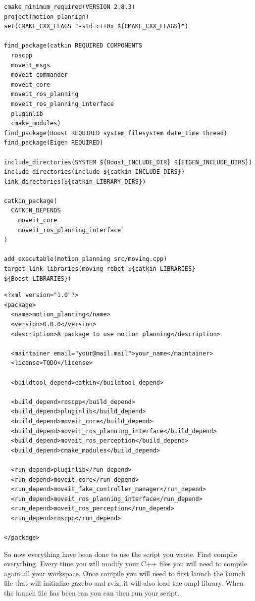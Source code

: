 \begin{lstlisting}[caption=CMakeLists.txt]
cmake_minimum_required(VERSION 2.8.3)
project(motion_plannign)
set(CMAKE_CXX_FLAGS "-std=c++0x ${CMAKE_CXX_FLAGS}")

find_package(catkin REQUIRED COMPONENTS
  roscpp
  moveit_msgs
  moveit_commander
  moveit_core
  moveit_ros_planning
  moveit_ros_planning_interface
  pluginlib
  cmake_modules)
find_package(Boost REQUIRED system filesystem date_time thread)
find_package(Eigen REQUIRED)

include_directories(SYSTEM ${Boost_INCLUDE_DIR} ${EIGEN_INCLUDE_DIRS})
include_directories(include ${catkin_INCLUDE_DIRS})
link_directories(${catkin_LIBRARY_DIRS})

catkin_package(
  CATKIN_DEPENDS
    moveit_core
    moveit_ros_planning_interface
)

add_executable(motion_planning src/moving.cpp)
target_link_libraries(moving_robot ${catkin_LIBRARIES} ${Boost_LIBRARIES})
\end{lstlisting}



\begin{lstlisting}[caption=package.xml]
<?xml version="1.0"?>
<package>
  <name>motion_planning</name>
  <version>0.0.0</version>
  <description>A package to use motion planning</description>

  <maintainer email="your@mail.mail">your_name</maintainer>
  <license>TODO</license>

  <buildtool_depend>catkin</buildtool_depend>
  
  <build_depend>roscpp</build_depend>
  <build_depend>pluginlib</build_depend>
  <build_depend>moveit_core</build_depend>
  <build_depend>moveit_ros_planning_interface</build_depend>
  <build_depend>moveit_ros_perception</build_depend>
  <build_depend>cmake_modules</build_depend>

  <run_depend>pluginlib</run_depend>
  <run_depend>moveit_core</run_depend>
  <run_depend>moveit_fake_controller_manager</run_depend>
  <run_depend>moveit_ros_planning_interface</run_depend>
  <run_depend>moveit_ros_perception</run_depend>
  <run_depend>roscpp</run_depend>

</package>
\end{lstlisting}


So now everything have been done to use the script you wrote. First compile everything. Every time you will modify your C++ files you will need to compile again all your workspace. Once compile you will need to first launch the launch file that will initialize gazebo and rviz, it will also load the ompl library. When the launch file has been ran you can then run your script.


